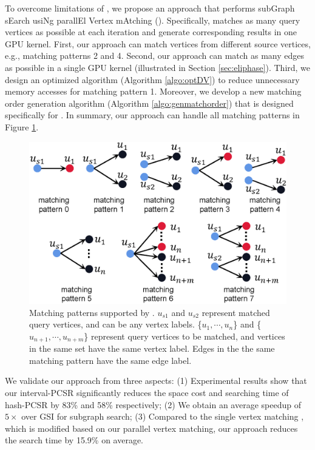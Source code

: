 To overcome limitations of \cite{lai2015scalable}, we propose an approach that performs subGraph sEarch usiNg parallEl Vertex mAtching (\SystemName).  Specifically, \SystemName matches as many query vertices as possible at each iteration and generate corresponding results in one GPU kernel. First, our approach can match vertices from different source vertices, e.g., matching patterns 2 and 4. Second, our approach can match as many edges as possible in a single GPU kernel (illustrated in Section \ref{sec:eliphase}). Third, we design an optimized algorithm (Algorithm \ref{algo:optDV}) to reduce unnecessary memory accesses for matching pattern 1. Moreover, we develop a new matching order generation algorithm (Algorithm \ref{algo:genmatchorder}) that is designed specifically for \SystemName. In summary, our approach can handle all matching patterns in Figure \ref{fig:matchpattern}.

\begin{figure}
\centering
\includegraphics[width=0.9\columnwidth]{./figure/extpattern.eps}
\caption{Matching patterns supported by \SystemName. $u_{s1}$ and $u_{s2}$ represent matched query vertices, and can be any vertex labels. \{$u_1, \cdots, u_{n}$\} and
\{$u_{n+1}, \cdots, u_{n+m}$\} represent query vertices to be matched, and vertices in the same set have the same vertex label. Edges in the the same matching pattern have the same edge label.}
\label{fig:matchpattern}
\end{figure}

 We validate our approach from three aspects: (1) Experimental results show that our interval-PCSR significantly reduces the space cost and searching time of hash-PCSR by 83\% and 58\% respectively; (2) We obtain an average speedup of $5\times$ over GSI for subgraph search; (3) Compared to the single vertex matching , which is modified based on our parallel vertex matching, our approach reduces the search time by 15.9\% on average.

